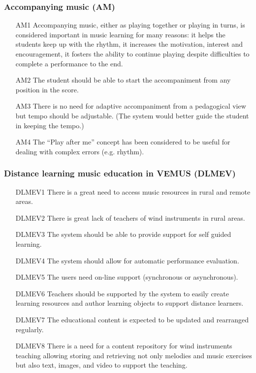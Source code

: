 \subsubsection{Accompanying music (AM)}
\begin{itemize}
\item[AM1] Accompanying music, either as playing together or playing in turns, is considered important in music learning for many reasons: it helps the students keep up with the rhythm, it increases the motivation, interest and encouragement, it fosters the ability to continue playing despite difficulties to complete a performance to the end.
\item[AM2] The student should be able to start the accompaniment from any position in the score.
\item[AM3] There is no need for adaptive accompaniment from a pedagogical view but tempo should be adjustable. (The system would better guide the student in keeping the tempo.)
\item[AM4] The “Play after me” concept has been considered to be useful for dealing with complex errors (e.g. rhythm).
\end{itemize}


\subsubsection{Distance learning music education in VEMUS (DLMEV)}
\begin{itemize}
\item[DLMEV1] There is a great need to access music resources in rural and remote areas.
\item[DLMEV2] There is great lack of teachers of wind instruments in rural areas.
\item[DLMEV3] The system should be able to provide support for self guided learning.
\item[DLMEV4] The system should allow for automatic performance evaluation.
\item[DLMEV5] The users need on-line support (synchronous or asynchronous).
\item[DLMEV6] Teachers should be supported by the system to easily create learning resources and author learning objects to support distance learners.
\item[DLMEV7] The educational content is expected to be updated and rearranged regularly.
\item[DLMEV8] There is a need for a content repository for wind instruments teaching allowing storing and retrieving not only melodies and music exercises but also text, images, and video to support the teaching.
\end{itemize}


